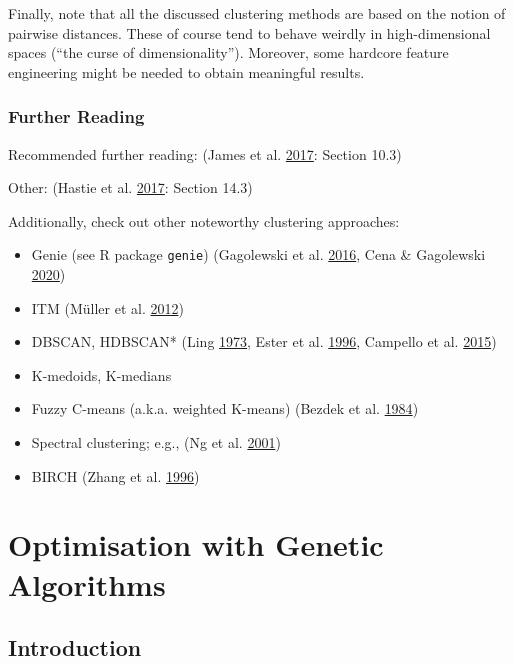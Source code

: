 \documentclass[10pt,b5paper,krantz1]{krantz}
\providecommand{\tightlist}{%
  \setlength{\itemsep}{0pt}\setlength{\parskip}{0pt}}
\begin{document}
Finally, note that all the discussed clustering methods are based on the
notion of pairwise distances. These of course tend
to behave weirdly in high-dimensional
spaces (``the curse of dimensionality''). Moreover, some hardcore
feature engineering might be needed to obtain meaningful results.

\hypertarget{further-reading-6}{%
\subsection{Further Reading}\label{further-reading-6}}

Recommended further reading: (James et al. \protect\hyperlink{ref-islr}{2017}: Section 10.3)

Other: (Hastie et al. \protect\hyperlink{ref-esl}{2017}: Section 14.3)

Additionally, check out other noteworthy clustering approaches:

\begin{itemize}
\tightlist
\item
  Genie (see R package \texttt{genie}) (Gagolewski et al. \protect\hyperlink{ref-genie}{2016}, Cena \& Gagolewski \protect\hyperlink{ref-genieowa}{2020})
\item
  ITM (Müller et al. \protect\hyperlink{ref-itm}{2012})
\item
  DBSCAN, HDBSCAN* (Ling \protect\hyperlink{ref-pre_dbscan}{1973}, Ester et al. \protect\hyperlink{ref-dbscan}{1996}, Campello et al. \protect\hyperlink{ref-hdbscan}{2015})
\item
  K-medoids, K-medians
\item
  Fuzzy C-means (a.k.a. weighted K-means) (Bezdek et al. \protect\hyperlink{ref-cmeans}{1984})
\item
  Spectral clustering; e.g., (Ng et al. \protect\hyperlink{ref-spectral_nips}{2001})
\item
  BIRCH (Zhang et al. \protect\hyperlink{ref-birch}{1996})
\end{itemize}

\hypertarget{optimisation-with-genetic-algorithms}{%
\chapter{Optimisation with Genetic Algorithms}\label{optimisation-with-genetic-algorithms}}

\hypertarget{introduction-14}{%
\section{Introduction}\label{introduction-14}}
\end{document}
